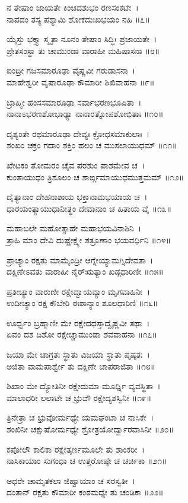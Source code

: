 ನ ತೇಷಾಂ ಜಾಯತೇ ಕಿಂಚಿದಶುಭಂ ರಣಸಂಕಟೇ~।\\
ನಾಪದಂ ತಸ್ಯ ಪಶ್ಯಾಮಿ ಶೋಕದುಃಖಭಯಂ ನಹಿ ॥೭॥

ಯೈಸ್ತು ಭಕ್ತ್ಯಾ ಸ್ಮೃತಾ ನೂನಂ ತೇಷಾಂ ಸಿದ್ಧಿಃ ಪ್ರಜಾಯತೇ~।\\
ಪ್ರೇತಸಂಸ್ಥಾ ತು ಚಾಮುಂಡಾ ವಾರಾಹೀ ಮಹಿಷಾಸನಾ ॥೮॥

ಐಂದ್ರೀ ಗಜಸಮಾರೂಢಾ ವೈಷ್ಣವೀ ಗರುಡಾಸನಾ~।\\
ಮಾಹೇಶ್ವರೀ ವೃಷಾರೂಢಾ ಕೌಮಾರೀ ಶಿಖಿವಾಹನಾ ॥೯॥

ಬ್ರಾಹ್ಮೀ ಹಂಸಸಮಾರೂಢಾ ಸರ್ವಾಭರಣಭೂಷಿತಾ~।\\
ನಾನಾಽಭರಣಶೋಭಾಢ್ಯಾ ನಾನಾರತ್ನೋಪಶೋಭಿತಾಃ ॥೧೦॥

ದೃಶ್ಯಂತೇ ರಥಮಾರೂಢಾ ದೇವ್ಯಃ ಕ್ರೋಧಸಮಾಕುಲಾಃ~।\\
ಶಂಖಂ ಚಕ್ರಂ ಗದಾಂ ಶಕ್ತಿಂ ಹಲಂ ಚ ಮುಸಲಾಯುಧಮ್ ॥೧೧॥

ಖೇಟಕಂ ತೋಮರಂ ಚೈವ ಪರಶುಂ ಪಾಶಮೇವ ಚ~।\\
ಕುಂತಾಯುಧಂ ತ್ರಿಶೂಲಂ ಚ ಶಾರ್ಙ್ಗಮಾಯುಧಮುತ್ತಮಮ್ ॥೧೨॥

ದೈತ್ಯಾನಾಂ ದೇಹನಾಶಾಯ ಭಕ್ತಾನಾಮಭಯಾಯ ಚ~।\\
ಧಾರಯಂತ್ಯಾಯುಧಾನೀತ್ಥಂ ದೇವಾನಾಂ ಚ ಹಿತಾಯ ವೈ ॥೧೩॥

ಮಹಾಬಲೇ ಮಹೋತ್ಸಾಹೇ ಮಹಾಭಯವಿನಾಶಿನಿ~।\\
ತ್ರಾಹಿ ಮಾಂ ದೇವಿ ದುಷ್ಪ್ರೇಕ್ಷ್ಯೇ ಶತ್ರೂಣಾಂ ಭಯವರ್ಧಿನಿ ॥೧೪॥

ಪ್ರಾಚ್ಯಾಂ ರಕ್ಷತು ಮಾಮೈಂದ್ರೀ ಆಗ್ನೇಯ್ಯಾಮಗ್ನಿದೇವತಾ~।\\
ದಕ್ಷಿಣೇಽವತು ವಾರಾಹೀ ನೈರ್‌ಋತ್ಯಾಂ ಖಡ್ಗಧಾರಿಣೀ ॥೧೫॥

ಪ್ರತೀಚ್ಯಾಂ ವಾರುಣೀ ರಕ್ಷೇದ್ವಾಯವ್ಯಾಂ ಮೃಗವಾಹಿನೀ~।\\
ಉದೀಚ್ಯಾಂ ರಕ್ಷ ಕೌಬೇರಿ ಈಶಾನ್ಯಾಂ ಶೂಲಧಾರಿಣಿ ॥೧೬॥

ಊರ್ಧ್ವಂ ಬ್ರಹ್ಮಾಣೀ ಮೇ ರಕ್ಷೇದಧಸ್ತಾದ್ವೈಷ್ಣವೀ ತಥಾ~।\\
ಏವಂ ದಶ ದಿಶೋ ರಕ್ಷೇಚ್ಚಾಮುಂಡಾ ಶವವಾಹನಾ ॥೧೭॥

ಜಯಾ ಮೇ ಚಾಗ್ರತಃ ಸ್ಥಾತು ವಿಜಯಾ ಸ್ಥಾತು ಪೃಷ್ಠತಃ~।\\
ಅಜಿತಾ ವಾಮಪಾರ್ಶ್ವೇ ತು ದಕ್ಷಿಣೇ ಚಾಪರಾಜಿತಾ ॥೧೮॥

ಶಿಖಾಂ ಮೇ ದ್ಯೋತಿನೀ ರಕ್ಷೇದುಮಾ ಮೂರ್ಧ್ನಿ ವ್ಯವಸ್ಥಿತಾ~।\\
ಮಾಲಾಧರೀ ಲಲಾಟೇ ಚ ಭ್ರುವೌ ರಕ್ಷೇದ್ಯಶಸ್ವಿನೀ ॥೧೯॥

ತ್ರಿನೇತ್ರಾ ಚ ಭ್ರುವೋರ್ಮಧ್ಯೇ ಯಮಘಂಟಾ ಚ ನಾಸಿಕೇ~।\\
ಶಂಖಿನೀ ಚಕ್ಷುಷೋರ್ಮಧ್ಯೇ ಶ್ರೋತ್ರಯೋರ್ದ್ವಾರವಾಸಿನೀ ॥೨೦॥

ಕಪೋಲೌ ಕಾಲಿಕಾ ರಕ್ಷೇತ್ಕರ್ಣಮೂಲೇ ತು ಶಾಂಕರೀ~।\\
ನಾಸಿಕಾಯಾಂ ಸುಗಂಧಾ ಚ ಉತ್ತರೋಷ್ಠೇ ಚ ಚರ್ಚಿಕಾ ॥೨೧॥

ಅಧರೇ ಚಾಮೃತಕಲಾ ಜಿಹ್ವಾಯಾಂ ಚ ಸರಸ್ವತೀ~।\\
ದಂತಾನ್ ರಕ್ಷತು ಕೌಮಾರೀ ಕಂಠಮಧ್ಯೇ ತು ಚಂಡಿಕಾ ॥೨೨॥

